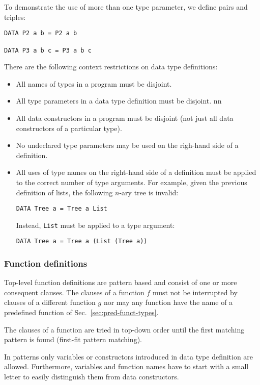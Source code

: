 \documentclass{article}
\begin{document}
To demonstrate the use of more than one type parameter, we define
pairs and triples:
\begin{verbatim}
DATA P2 a b = P2 a b

DATA P3 a b c = P3 a b c
\end{verbatim}

There are the following context restrictions on data type definitions:
\begin{itemize}
\item All names of types in a program must be disjoint.
\item All type parameters in a data type definition must be disjoint.
nn\item All data constructors in a program must be disjoint (not just
  all data constructors of a particular type).
\item No undeclared type parameters may be used on the righ-hand side
  of a definition.
\item All uses of type names on the right-hand side of a definition
  must be applied to the correct number of type arguments. For
  example, given the previous definition of lists, the following
  $n$-ary tree is invalid:
\begin{verbatim}
DATA Tree a = Tree a List
\end{verbatim}
  Instead, \verb|List| must be applied to a type argument:
\begin{verbatim}
DATA Tree a = Tree a (List (Tree a))
\end{verbatim}
\end{itemize}


\subsubsection{Function definitions}
\label{sec:function-definitions}

Top-level function definitions are pattern based and consist of one or
more consequent clauses. The clauses of a function $f$ must not be
interrupted by clauses of a different function $g$ nor may any
function have the name of a predefined function of
Sec.~\ref{sec:pred-funct-types}.

The clauses of a function are tried in top-down order until the first
matching pattern is found (first-fit pattern matching).

In patterns only variables or constructors introduced in data type
definition are allowed. Furthermore, variables and function names have
to start with a small letter to easily distinguish them from data
constructors.
\end{document}
